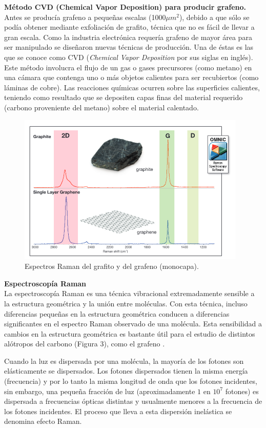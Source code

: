 \documentclass[twocolumn,letterpaper,aps,pra,10pt]{revtex4-1}
\begin{document}
\textbf{Método CVD (Chemical Vapor Deposition) para producir grafeno.}\\
Antes se producía grafeno a pequeñas escalas (1000$\mu m^{2}$), debido a que sólo se podía obtener mediante exfoliación de grafito, técnica que no es fácil de llevar a gran escala. Como la industria electrónica requería grafeno de mayor área para ser manipulado se diseñaron nuevas técnicas de producción. Una de éstas es las que se conoce como CVD  (\textit{Chemical Vapor Deposition} por sus siglas en inglés). Este método involucra el flujo de un gas o gases precursores  (como metano) en una cámara que contenga uno o más objetos calientes para ser recubiertos (como láminas de cobre). Las reacciones químicas ocurren sobre las superficies calientes, teniendo como resultado que se depositen capas finas del material requerido (carbono proveniente del metano) sobre el material calentado\cite{CVD}. 
\\
\begin{figure}[h]
\centering
\includegraphics[scale=0.5]{Raman.png}
\caption{Espectros Raman del grafito y del grafeno (monocapa).}
\end{figure}

\textbf{Espectroscopía Raman}\\
La espectroscopía Raman es una técnica vibracional extremadamente sensible a la estructura geométrica y la unión entre moléculas. Con esta técnica, incluso diferencias pequeñas en la estructura geométrica conducen a diferencias significantes en el espectro Raman observado de una molécula. Esta sensibilidad a cambios en la estructura geométrica es bastante útil para el estudio de distintos alótropos del carbono (Figura 3), como el grafeno \cite{Raman1}.

Cuando la luz es dispersada por una molécula, la mayoría de los fotones son elásticamente se dispersados. Los fotones dispersados tienen la misma energía (frecuencia) y por lo tanto la misma longitud de onda que los fotones incidentes, sin embargo, una pequeña fracción de luz (aproximadamente $1$ en $10^{7}$ fotones) es dispersada a frecuencias ópticas distintas y usualmente menores a la frecuencia de los fotones incidentes. El proceso que lleva a esta dispersión inelástica se denomina efecto Raman.
\end{document}
